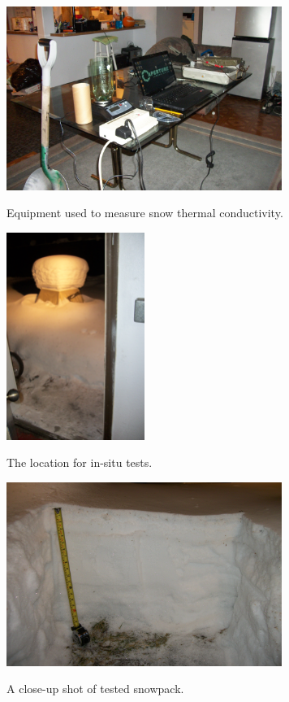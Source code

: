 \begin{figure}[h]
\centering
\includegraphics[width=0.8\textwidth]{fig/equipment.jpg}
\label{fig:equipment}
\caption{Equipment used to measure snow thermal conductivity.}
\end{figure}

\begin{figure}[h]
\centering
\includegraphics[width=0.4\textwidth]{fig/insitu_location.jpg}
\label{fig:insitu_location}
\caption{The location for in-situ tests.}
\end{figure}

\begin{figure}[h]
\centering
\includegraphics[width=0.8\textwidth]{fig/snowpack.jpg}
\label{fig:snowpack}
\caption{A close-up shot of tested snowpack.}
\end{figure}

